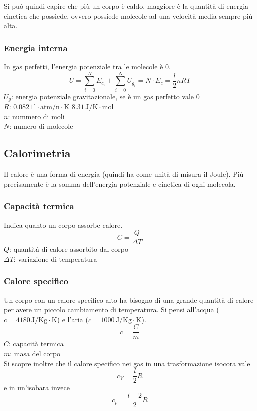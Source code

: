 Si può quindi capire che più un corpo è caldo, maggiore è la quantità di energia cinetica che possiede,
ovvero possiede molecole ad una velocità media sempre più alta.

\subsubsection{Energia interna}
In gas perfetti, l'energia potenziale tra le molecole è $0$.
\begin{equation*}
  U = \sum\limits_{i=0}^{N} E_{c_i} + \sum\limits_{i=0}^{N} U_{g_i} = N\cdot E_{c} = \frac{l}{2}nRT
\end{equation*}
$U_g$: energia potenziale gravitazionale, se è un gas perfetto vale $0$\\
\hyperref[tab:R]{$R$}: $0.0821\,\text{l}\cdot\text{atm/n}\cdot\text{K}$
$8.31\,\text{J/K}\cdot\text{mol}$\\
$n$: nummero di moli\\
$N$: numero di molecole

\subsection{Calorimetria}
Il calore è una forma di energia (quindi ha come unità di misura il Joule). Più precisamente è la
somma dell'energia potenziale e cinetica di ogni molecola.

\subsubsection{Capacità termica}
Indica quanto un corpo assorbe calore.
\begin{equation*}
  C = \frac{Q}{\Delta T}
\end{equation*}
$Q$: quantità di calore assorbito dal corpo\\
$\Delta T$: variazione di temperatura\\

\subsubsection{Calore specifico}
Un corpo con un calore specifico alto ha bisogno di una grande quantità di calore per avere un piccolo
cambiamento di temperatura. Si pensi all'acqua ($c=4180\,\text{J/Kg}\cdot\text{K}$) e l'aria
($c=1000\,\text{J/Kg}\cdot\text{K}$).
\begin{equation*}
  c = \frac{C}{m}
\end{equation*}
$C$: capacità termica\\
$m$: masa del corpo\\ [\baselineskip]
Si scopre inoltre che il calore specifico nei gas in una trasformazione isocora vale
\begin{equation*}
  c_V = \frac{l}{2}R
\end{equation*}
e in un'isobara invece
\begin{equation*}
  c_p = \frac{l+2}{2}R
\end{equation*}

